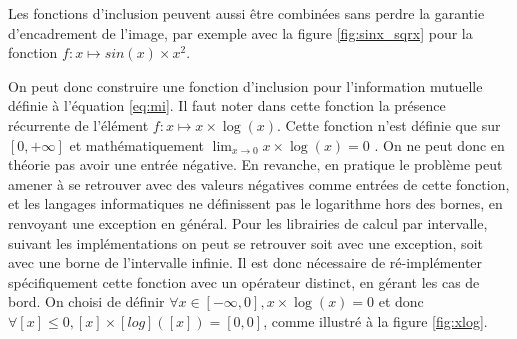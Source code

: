 \documentclass[12pt,a4paper]{article}
\begin{document}
    Les fonctions d'inclusion peuvent aussi être combinées sans perdre la garantie d'encadrement de l'image, par exemple avec la figure \ref{fig:sinx_sqrx} pour la fonction $f : x \mapsto sin(x) \times x^2$.

    On peut donc construire une fonction d'inclusion pour l'information mutuelle définie à l'équation \ref{eq:mi}. Il faut noter dans cette fonction la présence récurrente de l'élément $f : x \mapsto x \times \log(x)$. Cette fonction n'est définie que sur $[0, +\infty]$ et mathématiquement $\displaystyle \lim_{x \to 0} x\times\log(x) = 0$ . On ne peut donc en théorie pas avoir une entrée négative. En revanche, en pratique le problème peut amener à se retrouver avec des valeurs négatives comme entrées de cette fonction, et les langages informatiques ne définissent pas le logarithme hors des bornes, en renvoyant une exception en général. Pour les librairies de calcul par intervalle, suivant les implémentations on peut se retrouver soit avec une exception, soit avec une borne de l'intervalle infinie. Il est donc nécessaire de ré-implémenter spécifiquement cette fonction avec un opérateur distinct, en gérant les cas de bord. On choisi de définir $ \forall x \in [-\infty, 0], x \times \log(x) = 0$ et donc $\forall [x] \leq 0 , [x]\times[log]([x]) = [0, 0]$, comme illustré à la figure \ref{fig:xlog}.
\end{document}
